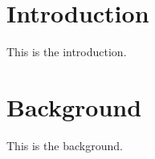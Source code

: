 \documentclass{book}
\begin{document}
\chapter{Introduction}
This is the introduction.

\chapter{Background}
This is the background.
\end{document}
